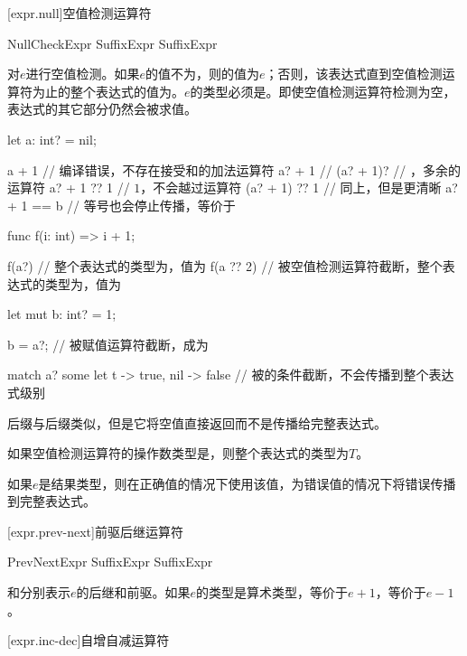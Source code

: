 [expr.null]{空值检测运算符}

\begin{bnf}{NullCheckExpr}
    SuffixExpr  \br
    SuffixExpr \terminal{!}
\end{bnf}

\pnum
{}对$e$进行空值检测。如果$e$的值不为，则的值为$e$；否则，该表达式直到空值检测运算符为止的整个表达式的值为。$e$的类型必须是。即使空值检测运算符检测为空，表达式的其它部分仍然会被求值。

\enterexample
\begin{codeblock}
let a: int? = nil;

a + 1 // 编译错误，不存在接受和的加法运算符
a? + 1 // 
(a? + 1)? // ，多余的运算符
a? + 1 ?? 1 // $1$，不会越过运算符
(a? + 1) ?? 1 // 同上，但是更清晰
a? + 1 == b // 等号也会停止传播，等价于

func f(i: int) => i + 1;

f(a?) // 整个表达式的类型为，值为
f(a ?? 2) // 被空值检测运算符截断，整个表达式的类型为，值为

let mut b: int? = 1;

b = a?; // 被赋值运算符截断，成为

match a? { some let t -> true, nil -> false } // 被的条件截断，不会传播到整个表达式级别
\end{codeblock}
\exitexample

\pnum
后缀\tcode{!}与后缀类似，但是它将空值直接返回而不是传播给完整表达式。

\pnum
如果空值检测运算符的操作数类型是，则整个表达式的类型为$T$。

\pnum
如果$e$是结果类型，则在正确值的情况下使用该值，为错误值的情况下将错误传播到完整表达式。

[expr.prev-next]{前驱后继运算符}

\begin{bnf}{PrevNextExpr}
    SuffixExpr \terminal{+!} \br
    SuffixExpr \terminal{-!}
\end{bnf}

\pnum
{}和分别表示$e$的后继和前驱。如果$e$的类型是算术类型，等价于$e+1$，等价于$e-1$。

[expr.inc-dec]{自增自减运算符}

